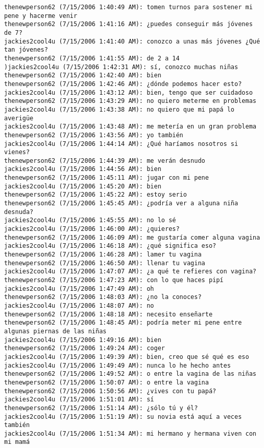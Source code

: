 \begin{verbatim}
thenewperson62 (7/15/2006 1:40:49 AM): tomen turnos para sostener mi pene y hacerme venir
thenewperson62 (7/15/2006 1:41:16 AM): ¿puedes conseguir más jóvenes de 7?
jackies2cool4u (7/15/2006 1:41:40 AM): conozco a unas más jóvenes ¿Qué tan jóvenes?
thenewperson62 (7/15/2006 1:41:55 AM): de 2 a 14
)jackies2cool4u (7/15/2006 1:42:31 AM): sí, conozco muchas niñas
thenewperson62 (7/15/2006 1:42:40 AM): bien
thenewperson62 (7/15/2006 1:42:46 AM): ¿dónde podemos hacer esto?
jackies2cool4u (7/15/2006 1:43:12 AM): bien, tengo que ser cuidadoso
thenewperson62 (7/15/2006 1:43:29 AM): no quiero meterme en problemas
jackies2cool4u (7/15/2006 1:43:38 AM): no quiero que mi papá lo averigüe
jackies2cool4u (7/15/2006 1:43:48 AM): me metería en un gran problema
thenewperson62 (7/15/2006 1:43:56 AM): yo también
jackies2cool4u (7/15/2006 1:44:14 AM): ¿Qué haríamos nosotros si vienes?
thenewperson62 (7/15/2006 1:44:39 AM): me verán desnudo
jackies2cool4u (7/15/2006 1:44:56 AM): bien
thenewperson62 (7/15/2006 1:45:11 AM): jugar con mi pene
jackies2cool4u (7/15/2006 1:45:20 AM): bien
thenewperson62 (7/15/2006 1:45:22 AM): estoy serio
thenewperson62 (7/15/2006 1:45:45 AM): ¿podría ver a alguna niña desnuda?
jackies2cool4u (7/15/2006 1:45:55 AM): no lo sé
jackies2cool4u (7/15/2006 1:46:00 AM): ¿quieres?
thenewperson62 (7/15/2006 1:46:09 AM): me gustaría comer alguna vagina
jackies2cool4u (7/15/2006 1:46:18 AM): ¿qué significa eso?
thenewperson62 (7/15/2006 1:46:28 AM): lamer tu vagina
thenewperson62 (7/15/2006 1:46:50 AM): llenar tu vagina
jackies2cool4u (7/15/2006 1:47:07 AM): ¿a qué te refieres con vagina?
thenewperson62 (7/15/2006 1:47:23 AM): con lo que haces pipí
jackies2cool4u (7/15/2006 1:47:49 AM): oh
thenewperson62 (7/15/2006 1:48:03 AM): ¿no la conoces?
jackies2cool4u (7/15/2006 1:48:07 AM): no
thenewperson62 (7/15/2006 1:48:18 AM): necesito enseñarte
thenewperson62 (7/15/2006 1:48:45 AM): podría meter mi pene entre algunas piernas de las niñas
jackies2cool4u (7/15/2006 1:49:16 AM): bien
thenewperson62 (7/15/2006 1:49:24 AM): coger
jackies2cool4u (7/15/2006 1:49:39 AM): bien, creo que sé qué es eso
jackies2cool4u (7/15/2006 1:49:49 AM): nunca lo he hecho antes
thenewperson62 (7/15/2006 1:49:52 AM): o entre la vagina de las niñas
thenewperson62 (7/15/2006 1:50:07 AM): o entre la vagina
thenewperson62 (7/15/2006 1:50:56 AM): ¿vives con tu papá?
jackies2cool4u (7/15/2006 1:51:01 AM): sí
thenewperson62 (7/15/2006 1:51:14 AM): ¿sólo tú y él?
jackies2cool4u (7/15/2006 1:51:19 AM): su novia está aquí a veces también
jackies2cool4u (7/15/2006 1:51:34 AM): mi hermano y hermana viven con mi mamá

\end{verbatim}
